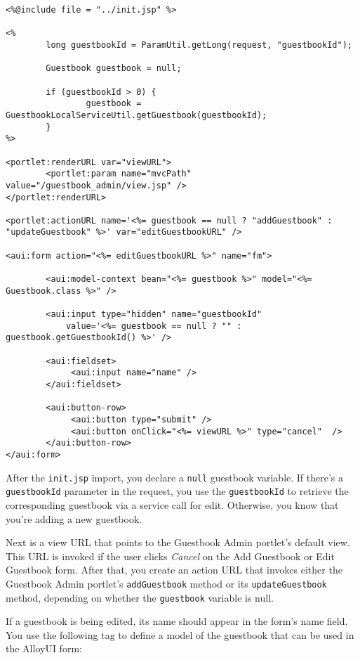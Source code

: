 \begin{verbatim}
<%@include file = "../init.jsp" %>

<%
        long guestbookId = ParamUtil.getLong(request, "guestbookId");
        
        Guestbook guestbook = null;

        if (guestbookId > 0) {
                guestbook = GuestbookLocalServiceUtil.getGuestbook(guestbookId);
        }
%>

<portlet:renderURL var="viewURL">
        <portlet:param name="mvcPath" value="/guestbook_admin/view.jsp" />
</portlet:renderURL>

<portlet:actionURL name='<%= guestbook == null ? "addGuestbook" : "updateGuestbook" %>' var="editGuestbookURL" />

<aui:form action="<%= editGuestbookURL %>" name="fm">

        <aui:model-context bean="<%= guestbook %>" model="<%= Guestbook.class %>" />

        <aui:input type="hidden" name="guestbookId"
            value='<%= guestbook == null ? "" : guestbook.getGuestbookId() %>' />

        <aui:fieldset>
             <aui:input name="name" />
        </aui:fieldset>

        <aui:button-row>
             <aui:button type="submit" />
             <aui:button onClick="<%= viewURL %>" type="cancel"  />
        </aui:button-row>
</aui:form>
\end{verbatim}

After the \texttt{init.jsp} import, you declare a \texttt{null}
guestbook variable. If there's a \texttt{guestbookId} parameter in the
request, you use the \texttt{guestbookId} to retrieve the corresponding
guestbook via a service call for edit. Otherwise, you know that you're
adding a new guestbook.

Next is a view URL that points to the Guestbook Admin portlet's default
view. This URL is invoked if the user clicks \emph{Cancel} on the Add
Guestbook or Edit Guestbook form. After that, you create an action URL
that invokes either the Guestbook Admin portlet's \texttt{addGuestbook}
method or its \texttt{updateGuestbook} method, depending on whether the
\texttt{guestbook} variable is null.

If a guestbook is being edited, its name should appear in the form's
name field. You use the following tag to define a model of the guestbook
that can be used in the AlloyUI form:

